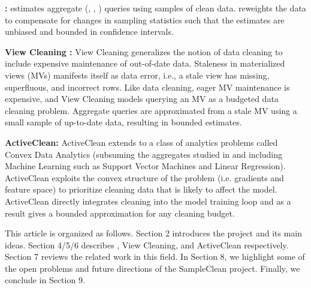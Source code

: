 \vspace{0.5em}
\noindent \textbf{\sampleclean \cite{wang1999sample}: } \sampleclean estimates aggregate (\sumfunc, \countfunc, \avgfunc) queries using samples of clean data. \sampleclean reweights the data to compensate for changes in sampling statistics such that the estimates are unbiased and bounded in confidence intervals.

\vspace{0.5em}
\noindent \textbf{View Cleaning \cite{krishnan2015svc}: } View Cleaning generalizes the notion of data cleaning to include expensive maintenance of out-of-date data. Staleness in materialized views (MVs) manifests itself as data error, i.e., a stale view has missing, superfluous, and incorrect rows.
Like data cleaning, eager MV maintenance is expensive, and View Cleaning models querying an MV as a budgeted data cleaning problem.
Aggregate queries are approximated from a stale MV using a small sample of up-to-date data, resulting in bounded estimates.

\vspace{0.5em}
\noindent \textbf{ActiveClean: } ActiveClean extends \sampleclean to a class of analytics problems called Convex Data Analytics (subsuming the aggregates studied in \sampleclean and including Machine Learning such as Support Vector Machines and Linear Regression). ActiveClean exploits the convex structure of the problem (i.e. gradients and feature space) to prioritize cleaning data that is likely to affect the model. ActiveClean directly integrates cleaning into the model training loop and as a result gives a bounded approximation for any cleaning budget.

\vspace{0.5em}

This article is organized as follows. Section 2 introduces the project and its main ideas. Section 4/5/6 describes \sampleclean, View Cleaning, and ActiveClean respectively. Section 7 reviews the related work in this field. In Section 8, we highlight some of the open problems and future directions of the SampleClean project. Finally, we conclude in Section 9.